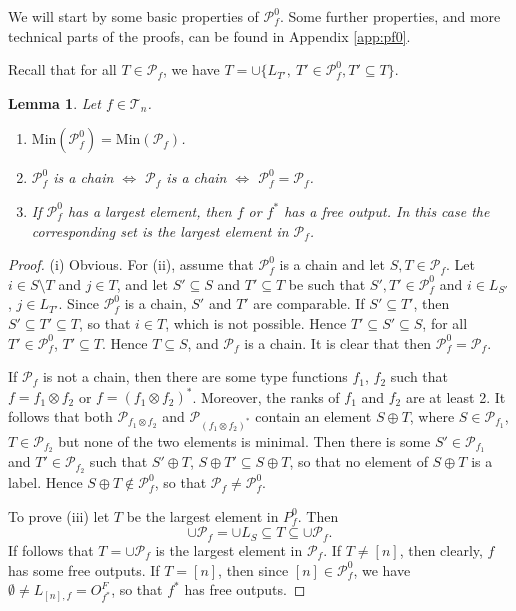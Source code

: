 \documentclass[12pt]{article}
\newtheorem{lemma}{Lemma}
\theoremstyle{definition}
\theoremstyle{remark}
\def\Te{\mathcal T}
\def\Pe{\mathcal P}
\begin{document}
We will start by some basic properties of $\Pe_f^0$. Some further properties, and more
technical parts of the proofs, can be found in Appendix \ref{app:pf0}. 

Recall that for all $T\in \Pe_f$, we have $T=\cup\{L_{T'},\ T'\in \Pe_f^0, T'\subseteq
T\}$.


\begin{lemma}\label{lemma:p0_basic} Let $f\in \Te_n$.
\begin{enumerate}
\item[(i)] $\mathrm{Min}(\Pe_f^0)=\mathrm{Min}(\Pe_f)$.
\item[(ii)] $\Pe_f^0$ is a chain $\iff$  $\Pe_f$ is a chain $\iff$  $\Pe_f^0= \Pe_f$.

\item[(iii)] If $\Pe^0_f$ has a largest element,  then $f$ or $f^*$ has a free
output. In this case  the corresponding set is the largest element in $\Pe_f$. 

\end{enumerate}
\end{lemma}


\begin{proof} 
(i) Obvious. For (ii), assume that $\Pe^0_f$ is a chain and let $S,T\in \Pe_f$. Let $i\in
S\setminus T$ and $j\in T$, and let $S'\subseteq  S$ and $T'\subseteq  T$ be such that $S',T'\in
\Pe_f^0$ and $i\in L_{S'}$, 
$j\in L_{T'}$. Since $\Pe_f^0$ is a chain, $S'$ and $T'$ are comparable. If $S'\subseteq T'$,
then $S'\subseteq  T'\subseteq  T$, so that $i\in T$, which is not possible. Hence
$T'\subseteq S' \subseteq S$, for all $T'\in \Pe_f^0$, $T'\subseteq T$. Hence $T\subseteq
S$, and $\Pe_f$ is a chain. It is clear that then $\Pe_f^0=\Pe_f$.  

If $\Pe_f$ is not a chain, then there are some type
functions
$f_1$, $f_2$ such that $f=f_1\otimes f_2$ or $f=(f_1\otimes f_2)^*$. Moreover, the ranks
of $f_1$ and $f_2$ are at least 2. It follows that both $\Pe_{f_1\otimes f_2}$ and
$\Pe_{(f_1\otimes f_2)^*}$ contain an element $S\oplus T$, where $S\in \Pe_{f_1}$, $T\in
\Pe_{f_2}$ but none of the two elements is minimal. Then there is some $S'\in \Pe_{f_1}$
and $T'\in \Pe_{f_2}$ such that $S'\oplus T$, $S\oplus T'\subseteq S\oplus T$, so that no
element of $S\oplus T$ is a label. Hence
$S\oplus T\notin
\Pe_f^0$, so that $\Pe_f\ne \Pe_f^0$. 

To prove (iii) let $T$ be the largest element in $P^0_f$. Then 
\[
\cup\Pe_f=\cup L_S \subseteq T\subseteq \cup \Pe_f.
\]
 If follows that $T=\cup\Pe_f $ is the largest element in $\Pe_f$. If $T\ne [n]$, then
 clearly, $f$ has some free outputs. If $T=[n]$, then since $[n]\in \Pe_f^0$, we have
 $\emptyset\ne L_{[n],f}=O_{f^*}^F$, so that $f^*$ has free outputs.

\end{proof}
\end{document}
